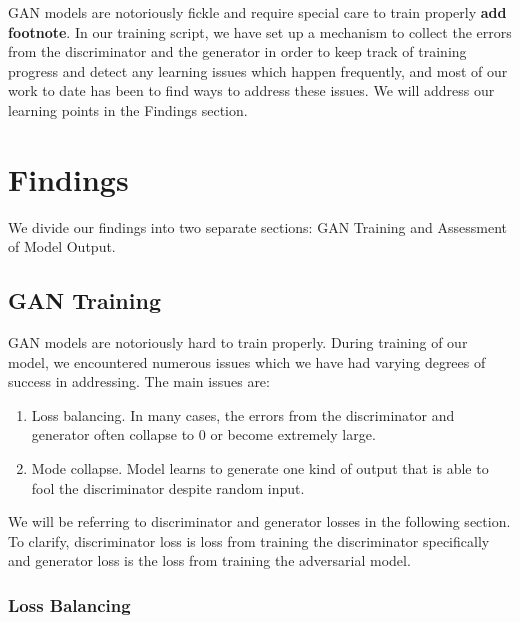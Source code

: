 \documentclass[12pt,oneside]{chicagocapstone}
\providecommand{\tightlist}{%
  \setlength{\itemsep}{0pt}\setlength{\parskip}{0pt}}
\begin{document}
GAN models are notoriously fickle and require special care to train properly \textbf{add footnote}. In our training script, we have set up a mechanism to collect the errors from the discriminator and the generator in order to keep track of training progress and detect any learning issues which happen frequently, and most of our work to date has been to find ways to address these issues. We will address our learning points in the Findings section.

\hypertarget{findings}{%
\chapter*{Findings}\label{findings}}

We divide our findings into two separate sections: GAN Training and Assessment of Model Output.

\hypertarget{findings-gan_training}{%
\section*{GAN Training}\label{findings-gan_training}}

GAN models are notoriously hard to train properly. During training of our model, we encountered numerous issues which we have had varying degrees of success in addressing. The main issues are:
\begin{enumerate}
\def\labelenumi{\arabic{enumi}.}
\tightlist
\item
  Loss balancing. In many cases, the errors from the discriminator and generator often collapse to 0 or become extremely large.
\item
  Mode collapse. Model learns to generate one kind of output that is able to fool the discriminator despite random input.
\end{enumerate}
We will be referring to discriminator and generator losses in the following section. To clarify, discriminator loss is loss from training the discriminator specifically and generator loss is the loss from training the adversarial model.

\hypertarget{loss-balancing}{%
\subsection*{Loss Balancing}\label{loss-balancing}}
\end{document}

